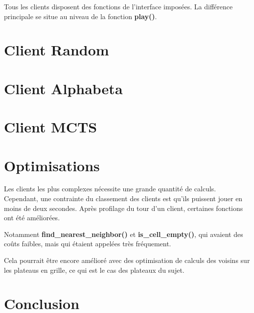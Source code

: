 \documentclass{article}
\begin{document}
Tous les clients disposent des fonctions de l'interface imposées.
La différence principale se situe au niveau de la fonction \textbf{play()}.

\section{Client Random}
\section{Client Alphabeta}
\section{Client MCTS}

\section{Optimisations}
Les clients les plus complexes nécessite une grande quantité de calculs.
Cependant, une contrainte du classement des clients est qu'ils puissent jouer en moins de deux secondes.
Après profilage du tour d'un client, certaines fonctions ont été améliorées.

Notamment \textbf{find\_nearest\_neighbor()} et \textbf{is\_cell\_empty()}, qui avaient des coûts faibles, 
mais qui étaient appelées très fréquement.

Cela pourrait être encore amélioré avec des 
optimisation de calculs des voisins sur les plateaus en grille, 
ce qui est le cas des plateaux du sujet.

\section{Conclusion}
\end{document}

